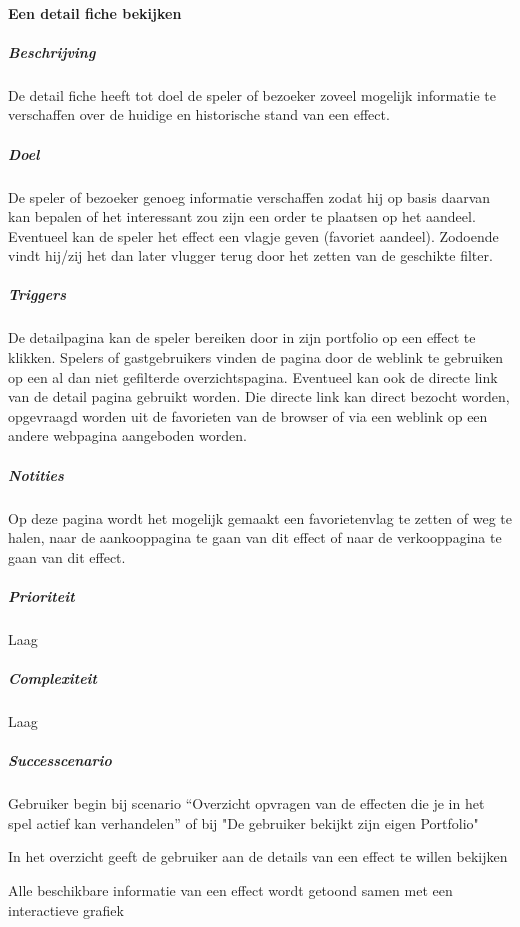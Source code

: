 \paragraph{Een detail fiche bekijken}
\begin{compact}
\subparagraph{Beschrijving} De detail fiche heeft tot doel de speler of bezoeker zoveel mogelijk informatie te verschaffen over de huidige en historische stand van een effect.
\subparagraph{Doel} De speler of bezoeker genoeg informatie verschaffen zodat hij op basis daarvan kan bepalen of het interessant zou zijn een order te plaatsen op het aandeel. Eventueel kan de speler het effect een vlagje geven (favoriet aandeel). Zodoende vindt hij/zij het dan later vlugger terug door het zetten van de geschikte filter.
\subparagraph{Triggers} De detailpagina kan de speler bereiken door in zijn portfolio op een effect te klikken. Spelers of gastgebruikers vinden de pagina door de weblink te gebruiken op een al dan niet gefilterde overzichtspagina. Eventueel kan ook de directe link van de detail pagina gebruikt worden. Die directe link kan direct bezocht worden, opgevraagd worden uit de favorieten van de browser of via een weblink op een andere webpagina aangeboden worden.
\subparagraph{Notities} Op deze pagina wordt het mogelijk gemaakt een favorietenvlag te zetten of weg te halen, naar de aankooppagina te gaan van dit effect of naar de verkooppagina te gaan van dit effect.
\subparagraph{Prioriteit}Laag
\subparagraph{Complexiteit}Laag
\subparagraph{Successcenario}
\begin{enumerate_compact}
 \item Gebruiker begin bij scenario ``Overzicht opvragen van de effecten die je in het spel actief kan verhandelen'' of bij "De gebruiker bekijkt zijn eigen Portfolio"
 \item In het overzicht geeft de gebruiker aan de details van een effect te willen bekijken
 \item Alle beschikbare informatie van een effect wordt getoond samen met een interactieve grafiek
\end{enumerate_compact}
\end{compact}

